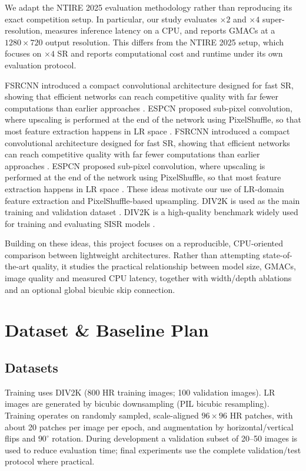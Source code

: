 \documentclass[11pt,a4paper]{article}
\begin{document}
We adapt the NTIRE 2025 evaluation methodology rather than reproducing its
exact competition setup. In particular, our study evaluates $\times2$ and
$\times4$ super-resolution, measures inference latency on a CPU, and
reports GMACs at a $1280\times720$ output resolution. This differs from the
NTIRE 2025 setup, which focuses on $\times4$ SR and reports computational
cost and runtime under its own evaluation protocol.

FSRCNN introduced a compact convolutional architecture designed for fast SR,
showing that efficient networks can reach competitive quality with far
fewer computations than earlier approaches \citep{dong2016fsrcnn}. ESPCN
proposed sub-pixel convolution, where upscaling is performed at the end of
the network using PixelShuffle, so that most feature extraction happens in
LR space \citep{shi2016espcn}. FSRCNN introduced a compact convolutional architecture designed for fast SR,
showing that efficient networks can reach competitive quality with far fewer
computations than earlier approaches \citep{dong2016fsrcnn}. ESPCN proposed
sub-pixel convolution, where upscaling is performed at the end of the network
using PixelShuffle, so that most feature extraction happens in LR space
\citep{shi2016espcn}. These ideas motivate our use of LR-domain feature
extraction and PixelShuffle-based upsampling. DIV2K is used as the main
training and validation dataset \citep{agustsson2017div2k}.
DIV2K is a high-quality benchmark widely used for training and evaluating
SISR models \citep{agustsson2017div2k}.

Building on these ideas, this project focuses on a reproducible,
CPU-oriented comparison between lightweight architectures. Rather than
attempting state-of-the-art quality, it studies the practical relationship
between model size, GMACs, image quality and measured CPU latency, together
with width/depth ablations and an optional global bicubic skip connection.

\section{Dataset \& Baseline Plan}
\label{sec:data}

\subsection{Datasets}

Training uses DIV2K (800 HR training images; 100 validation images). LR
images are generated by bicubic downsampling (PIL bicubic resampling).
Training operates on randomly sampled, scale-aligned $96\times96$ HR
patches, with about 20 patches per image per epoch, and augmentation by
horizontal/vertical flips and $90^\circ$ rotation. During development a
validation subset of 20--50 images is used to reduce evaluation time; final
experiments use the complete validation/test protocol where practical.
\end{document}
